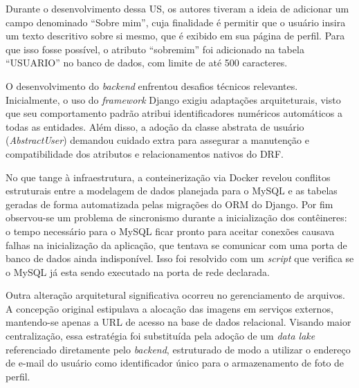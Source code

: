 
Durante o desenvolvimento dessa US, os autores tiveram a ideia de adicionar um campo denominado ``Sobre mim'', cuja finalidade é permitir que o usuário insira um texto descritivo sobre si mesmo, que é exibido em sua página de perfil. Para que isso fosse possível, o atributo ``sobremim'' foi adicionado na tabela ``USUARIO'' no banco de dados, com limite de até 500 caracteres.

O desenvolvimento do \textit{backend} enfrentou desafios técnicos relevantes. Inicialmente, o uso do \textit{framework} Django exigiu adaptações arquiteturais, visto que seu comportamento padrão atribui identificadores numéricos automáticos a todas as entidades.
Além disso, a adoção da classe abstrata de usuário (\textit{AbstractUser}) demandou cuidado extra para assegurar a manutenção e compatibilidade dos atributos e relacionamentos nativos do DRF.

No que tange à infraestrutura, a conteinerização via Docker revelou conflitos estruturais entre a modelagem de dados planejada para o MySQL e as tabelas geradas de forma automatizada pelas migrações do ORM do Django. Por fim observou-se um problema de sincronismo durante a inicialização dos contêineres: o tempo necessário para o MySQL ficar pronto para aceitar conexões causava falhas na inicialização da aplicação, que tentava se comunicar com uma porta de banco de dados ainda indisponível. Isso foi resolvido com um \textit{script} que verifica se o MySQL já esta sendo executado na porta de rede declarada.

Outra alteração arquitetural significativa ocorreu no gerenciamento de arquivos. A concepção original estipulava a alocação das imagens em serviços externos, mantendo-se apenas a URL de acesso na base de dados relacional. Visando maior centralização, essa estratégia foi substituída pela adoção de um \textit{data lake} referenciado diretamente pelo \textit{backend}, estruturado de modo a utilizar o endereço de e-mail do usuário como identificador único para o armazenamento de foto de perfil.

